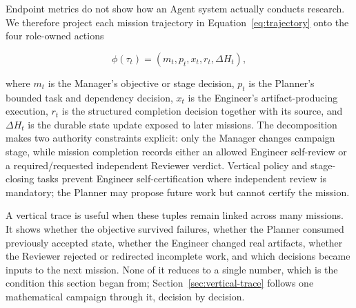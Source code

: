 Endpoint metrics do not show how an Agent system actually conducts research. We
therefore project each mission trajectory in Equation~\ref{eq:trajectory} onto
the four role-owned actions

\begin{equation}
  \phi(\tau_t)=\left(m_t,p_t,x_t,r_t,\Delta H_t\right),
  \label{eq:role-resolved-trace}
\end{equation}

where $m_t$ is the Manager's objective or stage decision, $p_t$ is the Planner's
bounded task and dependency decision, $x_t$ is the Engineer's artifact-producing
execution, $r_t$ is the structured completion decision together with its source,
and $\Delta H_t$ is the durable state update exposed to later missions. The
decomposition makes two authority constraints explicit: only the Manager changes
campaign stage, while mission completion records either an allowed Engineer
self-review or a required/requested independent Reviewer verdict. Vertical policy
and stage-closing tasks prevent Engineer self-certification where independent
review is mandatory; the Planner may propose future work but cannot certify the
mission.

A vertical trace is useful when these tuples remain linked across many missions.
It shows whether the objective survived failures, whether the Planner consumed
previously accepted state, whether the Engineer changed real artifacts, whether
the Reviewer rejected or redirected incomplete work, and which decisions became
inputs to the next mission. None of it reduces to a single number, which is the
condition this section began from; Section~\ref{sec:vertical-trace} follows one
mathematical campaign through it, decision by decision.
